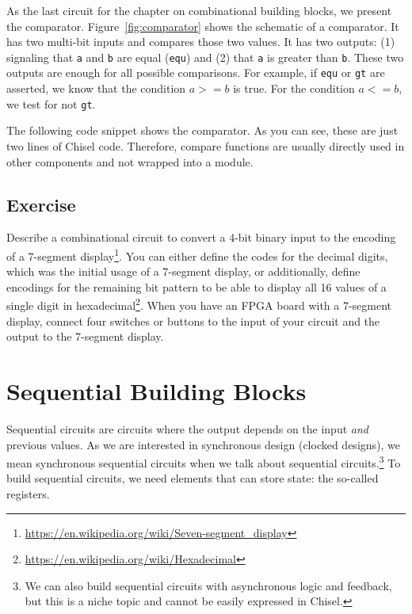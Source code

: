 \documentclass[%
    10pt,
    headinclude, footinclude=false,
    openright, %
    notitlepage,
    cleardoublepage=empty,
    headsepline,
    numbers=noenddot,
    bibliography=totoc, index=totoc,
    ]{scrbook}
\newcommand{\code}[1]{{\lstinline[basicstyle=\small\ttfamily]{#1}}}
\newcommand{\myref}[2]{\href{#1}{#2}}
\renewcommand{\myref}[2]{{#2}{\footnote{\url{#1}}}}
\begin{document}
As the last circuit for the chapter on combinational building blocks, we present the comparator.
Figure~\ref{fig:comparator} shows the schematic of a comparator. It has two multi-bit inputs and
compares those two values. It has two outputs: (1) signaling that \code{a} and \code{b} are equal (\code{equ})
and (2) that \code{a} is greater than \code{b}. These two outputs are enough for all possible
comparisons. For example, if \code{equ} or \code{gt} are asserted, we know that the condition
$a >= b$ is true. For the condition $a <= b$, we test for not \code{gt}.

The following code snippet shows the comparator. As you can see, these are just two lines of
Chisel code. Therefore, compare functions are usually directly used in other components and
not wrapped into a module.


\section{Exercise}

Describe a combinational circuit to convert a 4-bit binary input to the encoding of a
\myref{https://en.wikipedia.org/wiki/Seven-segment_display}{7-segment display}.
You can either define the codes for the decimal digits, which was the initial
usage of a 7-segment display, or additionally, define encodings for the remaining bit pattern
to be able to display all 16 values of a single digit in
\myref{https://en.wikipedia.org/wiki/Hexadecimal}{hexadecimal}.
When you have an FPGA board with a 7-segment display, connect four switches or
buttons to the input of your circuit and the output to the 7-segment display.

\chapter{Sequential Building Blocks}
\label{sec:sequential}

Sequential circuits are circuits where the output depends on the input \emph{and}
previous values. As we are interested in synchronous design (clocked designs),
we mean synchronous sequential circuits when we talk about sequential
circuits.\footnote{We can also build sequential circuits with asynchronous logic and
feedback, but this is a niche topic and cannot be easily expressed in Chisel.}
To build sequential circuits, we need elements that can store state:
the so-called registers.
\end{document}

